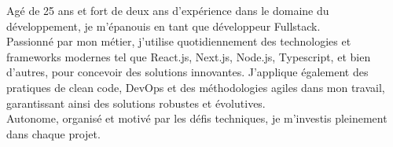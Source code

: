 
\begin{cvparagraph}
    Agé de 25 ans et fort de deux ans d'expérience dans le domaine du développement, je m'épanouis en tant que développeur Fullstack.\\
    Passionné par mon métier, j'utilise quotidiennement des technologies et frameworks modernes tel que React.js, Next.js, Node.js, Typescript, et bien d'autres, pour concevoir des solutions innovantes. J'applique également des pratiques de clean code, DevOps et des méthodologies agiles dans mon travail, garantissant ainsi des solutions robustes et évolutives.\\
    Autonome, organisé et motivé par les défis techniques, je m'investis pleinement dans chaque projet.
\end{cvparagraph}
